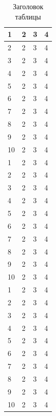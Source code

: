 \documentclass[a4paper,14pt]{extarticle}
\begin{document}
\begin{center}
    \begin{longtable}{|p{2cm}|p{3cm}|p{7cm}|p{3cm}|}
        \caption{Заголовок таблицы} \\
        \hline
        1  & 2 & 3 & 4              \\
        \hline
        2  & 2 & 3 & 4              \\
        \hline
        3  & 2 & 3 & 4              \\
        \hline
        4  & 2 & 3 & 4              \\
        \hline
        5  & 2 & 3 & 4              \\
        \hline
        6  & 2 & 3 & 4              \\
        \hline
        7  & 2 & 3 & 4              \\
        \hline
        8  & 2 & 3 & 4              \\
        \hline
        9  & 2 & 3 & 4              \\
        \hline
        10 & 2 & 3 & 4              \\
        \hline
        1  & 2 & 3 & 4              \\
        \hline
        2  & 2 & 3 & 4              \\
        \hline
        3  & 2 & 3 & 4              \\
        \hline
        4  & 2 & 3 & 4              \\
        \hline
        5  & 2 & 3 & 4              \\
        \hline
        6  & 2 & 3 & 4              \\
        \hline
        7  & 2 & 3 & 4              \\
        \hline
        8  & 2 & 3 & 4              \\
        \hline
        9  & 2 & 3 & 4              \\
        \hline
        10 & 2 & 3 & 4              \\
        \hline
        1  & 2 & 3 & 4              \\
        \hline
        2  & 2 & 3 & 4              \\
        \hline
        3  & 2 & 3 & 4              \\
        \hline
        4  & 2 & 3 & 4              \\
        \hline
        5  & 2 & 3 & 4              \\
        \hline
        6  & 2 & 3 & 4              \\
        \hline
        7  & 2 & 3 & 4              \\
        \hline
        8  & 2 & 3 & 4              \\
        \hline
        9  & 2 & 3 & 4              \\
        \hline
        10 & 2 & 3 & 4              \\
        \hline
    \end{longtable}
\end{center}
\end{document}
